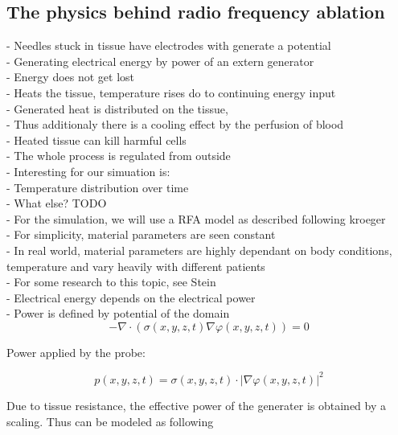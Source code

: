 \documentclass[parskip=half, titlepage=yes, 12pt, BCOR=12mm, DIV=calc]{scrartcl}
\begin{document}
\subsection{The physics behind radio frequency ablation}
- Needles stuck in tissue have electrodes with generate a potential \\
- Generating electrical energy by power of an extern generator \\
- Energy does not get lost \\
- Heats the tissue, temperature rises do to continuing energy input \\
- Generated heat is distributed on the tissue,  \\
- Thus additionaly there is a cooling effect by the perfusion of blood \\
- Heated tissue can kill harmful cells \\
- The whole process is regulated from outside \\

- Interesting for our simuation is: \\
- Temperature distribution over time \\
- What else? TODO \\

- For the simulation, we will use a RFA model as described following kroeger \\
- For simplicity, material parameters are seen constant \\
- In real world, material parameters are highly dependant on body conditions, temperature and vary heavily with different patients \\
- For some research to this topic, see Stein \\

- Electrical energy depends on the electrical power \\
- Power is defined by potential of the domain \\

\begin{equation}
    - \nabla \cdot (\sigma(x,y,z,t) \nabla \varphi(x,y,z,t)) = 0
\end{equation}

Power applied by the probe:

\begin{equation}
    p(x,y,z,t) = \sigma(x,y,z,t) \cdot |\nabla \varphi(x,y,z,t)|^2
\end{equation}

Due to tissue resistance, the effective power of the generater is obtained by a scaling. Thus can be modeled as following   
\end{document}
